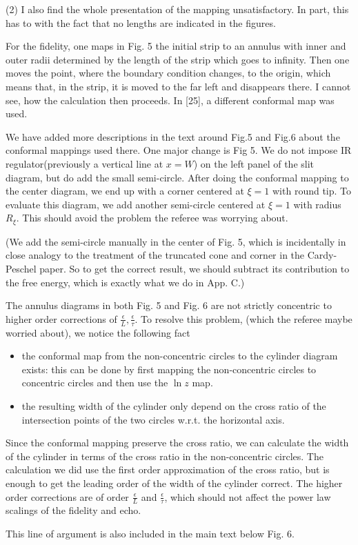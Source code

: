\documentclass{article}
\newcommand{\reply}[1]{{\color{black}#1}}
\begin{document}
(2) I also find the whole presentation of the mapping unsatisfactory. In part, this has to with the fact that no lengths are indicated in the figures.

For the fidelity, one maps in Fig. 5 the initial strip to an annulus with inner and outer radii determined by the length of the strip which goes to infinity. Then one moves the point, where the boundary condition changes, to the origin, which means that, in the strip, it is moved to the far left and disappears there. I cannot see, how the calculation then proceeds. In [25], a different conformal map was used.

\reply{
We have added more descriptions in the text around Fig.5 and Fig.6 about the conformal mappings used there. One major change is Fig 5. We do not impose IR regulator(previously a vertical line at $x = W$)  on the left panel of the slit diagram, but do add the small semi-circle. After doing the conformal mapping to the center diagram, we end up with a corner centered at $\xi = 1$ with round tip. To evaluate this diagram, we add another semi-circle centered at $\xi = 1$ with radius $R_{\xi}$. This should avoid the problem the referee was worrying about. 

(We add the semi-circle manually in the center of Fig. 5, which is incidentally in close analogy to the treatment of the truncated cone and corner in the Cardy-Peschel paper. So to get the correct result, we should subtract its contribution to the free energy, which is exactly what we do in App. C.)

The annulus diagrams in both Fig. 5 and Fig. 6 are not strictly concentric to higher order corrections of $\frac{\epsilon}{L}, \frac{\epsilon}{\tau}$. To resolve this problem, (which the referee maybe worried about), we notice the following fact
\begin{itemize}
\item the conformal map from the non-concentric circles to the cylinder diagram exists: this can be done by first mapping the non-concentric circles to concentric circles and then use the $\ln z$ map. 
\item the resulting width of the cylinder only depend on the cross ratio of the intersection points of the two circles w.r.t. the horizontal axis.
\end{itemize}
Since the conformal mapping preserve the cross ratio, we can calculate the width of the cylinder in terms of the cross ratio in the non-concentric circles. The calculation we did use the first order approximation of the cross ratio, but is enough to get the leading order of the width of the cylinder correct. The higher order corrections are of order $\frac{\epsilon}{L}$ and $\frac{\epsilon}{\tau}$, which should not affect the power law scalings of the fidelity and echo. 

This line of argument is also included in the main text below Fig. 6. 
}
\end{document}
